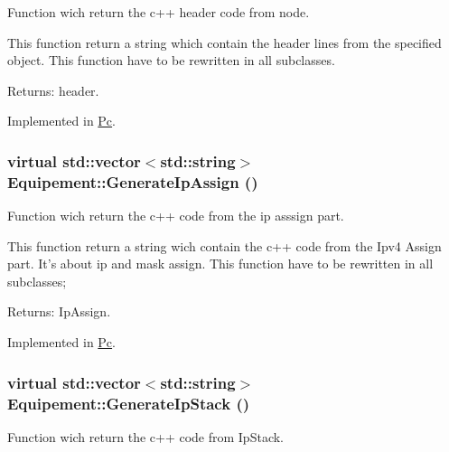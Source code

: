 Function wich return the c++ header code from node. 

This function return a string which contain the header lines from the specified object. This function have to be rewritten in all subclasses.

\begin{Desc}
\item[Returns:]header. \end{Desc}


Implemented in \hyperlink{class_pc_ca543f3f579e2531dfbe70a8ae419915}{Pc}.\hypertarget{class_equipement_643c6d9c56ed25c0319bfc84a6e064f5}{
\subsubsection[{GenerateIpAssign}]{\setlength{\rightskip}{0pt plus 5cm}virtual std::vector$<$std::string$>$ Equipement::GenerateIpAssign ()}}
\label{class_equipement_643c6d9c56ed25c0319bfc84a6e064f5}


Function wich return the c++ code from the ip asssign part. 

This function return a string wich contain the c++ code from the Ipv4 Assign part. It's about ip and mask assign. This function have to be rewritten in all subclasses;

\begin{Desc}
\item[Returns:]IpAssign. \end{Desc}


Implemented in \hyperlink{class_pc_3f50cc66c3e268c95b2d2b4b7f8c1246}{Pc}.\hypertarget{class_equipement_6d7c3d74a18a723f35f274fb5aa5f06b}{
\subsubsection[{GenerateIpStack}]{\setlength{\rightskip}{0pt plus 5cm}virtual std::vector$<$std::string$>$ Equipement::GenerateIpStack ()}}
\label{class_equipement_6d7c3d74a18a723f35f274fb5aa5f06b}


Function wich return the c++ code from IpStack. 

